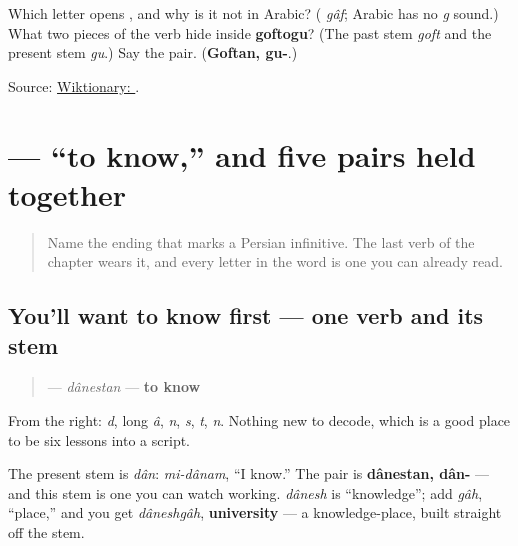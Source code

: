 \begin{tcolorbox}[breakable,colback=teal!4,colframe=teal!35!black,title={Before you move on}]
Which letter opens \textbf{}, and why is it not in Arabic? (\textbf{} \emph{gâf}; Arabic has no \emph{g} sound.) What two pieces of the verb hide inside \textbf{goftogu}? (The past stem \emph{goft} and the present stem \emph{gu}.) Say the pair. (\textbf{Goftan, gu-}.)

Source: \href{https://en.wiktionary.org/wiki/\%DA\%AF\%D9\%81\%D8\%AA\%D9\%86}{Wiktionary: }.
\end{tcolorbox}
\section[\texorpdfstring{\fa{دانستن} (dânestan)}{دانستن (dânestan)}]{ — “to know,” and five pairs held together}

\label{lesson:FA-C06-danestan}



\begin{quote}
Name the ending that marks a Persian infinitive. The last verb of the chapter wears it, and every letter in the word is one you can already read.
\end{quote}

\subsection*{You'll want to know first — one verb and its stem}
\begin{quote}
\textbf{} — \emph{dânestan} — \textbf{to know}
\end{quote}

From the right: \textbf{} \emph{d}, \textbf{} long \emph{â}, \textbf{} \emph{n}, \textbf{} \emph{s}, \textbf{} \emph{t}, \textbf{} \emph{n}. Nothing new to decode, which is a good place to be six lessons into a script.

The present stem is \textbf{} \emph{dân}: \emph{mi-dânam}, “I know.” The pair is \textbf{dânestan, dân-} — and this stem is one you can watch working. \emph{dânesh} is “knowledge”; add \emph{gâh}, “place,” and you get \emph{dâneshgâh}, \textbf{university} — a knowledge-place, built straight off the stem.

